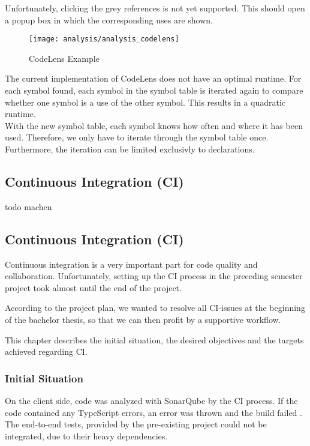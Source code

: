 Unfortunately, clicking the grey references is not yet supported. This should open a popup box in which the corresponding uses are shown.

\begin{figure}[H]
    \centering
    \texttt{[image: analysis/analysis\_codelens]}
    \caption{CodeLens Example}
    \label{fig:analysis_codelens}
\end{figure}

The current implementation of CodeLens does not have an optimal runtime. For each symbol found, each symbol in the symbol table is iterated again to compare whether one symbol is a use of the other symbol. This results in a quadratic runtime. \\

With the new symbol table, each symbol knows how often and where it has been used.
Therefore, we only have to iterate through the symbol table once.
Furthermore, the iteration can be limited exclusivly to  declarations.


\subsection{Continuous Integration (CI)}



todo machen 

\subsection{Continuous Integration (CI)}
Continuous integration is a very important part for code quality and collaboration.
Unfortunately, setting up the CI process in the preceding semester project\cite{sa} took almost until the end of the project.

According to the project plan, we wanted to resolve all CI-issues at the beginning of the bachelor thesis, so that we can then profit by a supportive workflow.

This chapter describes the initial situation, the desired objectives and the targets achieved regarding CI.

\subsubsection{Initial Situation}
On the client side, code was analyzed with SonarQube by the CI process.
If the code contained any TypeScript errors, an error was thrown and the build failed \cite{sa}.
The end-to-end tests, provided by the pre-existing project could not be integrated, due to their heavy dependencies.\\


